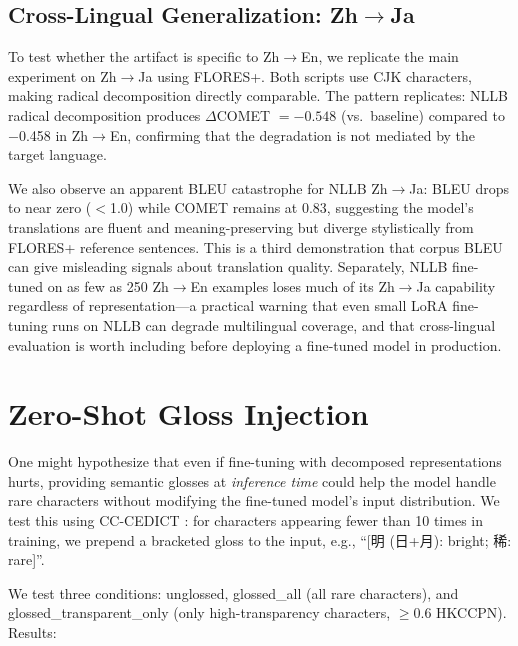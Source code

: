 \documentclass[11pt]{article}
\begin{document}
\subsection{Cross-Lingual Generalization: Zh$\to$Ja}
\label{sec:zhja}

To test whether the artifact is specific to Zh$\to$En, we replicate the main experiment on Zh$\to$Ja using FLORES+. Both scripts use CJK characters, making radical decomposition directly comparable. The pattern replicates: NLLB radical decomposition produces $\Delta$COMET $= -0.548$ (vs.\ baseline) compared to $-$0.458 in Zh$\to$En, confirming that the degradation is not mediated by the target language.

We also observe an apparent BLEU catastrophe for NLLB Zh$\to$Ja: BLEU drops to near zero ($<$1.0) while COMET remains at 0.83, suggesting the model's translations are fluent and meaning-preserving but diverge stylistically from FLORES+ reference sentences. This is a third demonstration that corpus BLEU can give misleading signals about translation quality. Separately, NLLB fine-tuned on as few as 250 Zh$\to$En examples loses much of its Zh$\to$Ja capability regardless of representation---a practical warning that even small LoRA fine-tuning runs on NLLB can degrade multilingual coverage, and that cross-lingual evaluation is worth including before deploying a fine-tuned model in production.

\section{Zero-Shot Gloss Injection}
\label{sec:gloss}

One might hypothesize that even if fine-tuning with decomposed representations hurts, providing semantic glosses at \textit{inference time} could help the model handle rare characters without modifying the fine-tuned model's input distribution. We test this using CC-CEDICT \citep{cc-cedict}: for characters appearing fewer than 10 times in training, we prepend a bracketed gloss to the input, e.g., ``[明 (日+月): bright; 稀: rare]''.

We test three conditions: unglossed, glossed\_all (all rare characters), and glossed\_transparent\_only (only high-transparency characters, $\geq$0.6 HKCCPN). Results:
\end{document}
